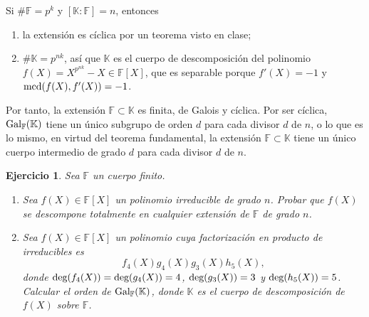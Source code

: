 \documentclass[11pt]{report}
\makeatletter
\renewenvironment{proof}[1][\proofname]{\par
  \pushQED{\qed}%
  \normalfont \topsep\z@skip %
  \trivlist
  \item[\hskip\labelsep
        \itshape
    #1\@addpunct{.}]\ignorespaces
}{%
  \popQED\endtrivlist\@endpefalse
}
\newcommand{\F}{\mathbb F}
\newcommand{\K}{\mathbb K}
\newtheorem{ejercicio}{Ejercicio}
\makeatother
\begin{document}
\begin{proof}
Si $\#\F = p^k$ y $[\K \colon \F] = n$, entonces
\begin{enumerate}
    \item la extensión es cíclica por un teorema visto en clase;
    \item $\#\K = p^{nk}$, así que $\K$ es el cuerpo de descomposición del polinomio $f(X) =X^{p^{nk}}-X \in \F[X]$, que es separable porque $f'(X) = -1$ y $\textup{mcd}(f(X),f'(X))=-1$.
\end{enumerate}

Por tanto, la extensión $\F \subset \K$ es finita, de Galois y cíclica. Por ser cíclica, $\textup{Gal}_\F(\K)$ tiene un único subgrupo de orden $d$ para cada divisor $d$ de $n$, o lo que es lo mismo, en virtud del teorema fundamental, la extensión $\F \subset \K$ tiene un único cuerpo intermedio de grado $d$ para cada divisor $d$ de $n$.
\end{proof}

\begin{ejercicio}
Sea $\F$ un cuerpo finito.
\begin{enumerate}
    \item Sea $f(X) \in \F[X]$ un polinomio irreducible de grado $n$. Probar que $f(X)$ se descompone totalmente en cualquier extensión de $\F$ de grado $n$.
    \item Sea $f(X) \in \F[X]$ un polinomio cuya factorización en producto de irreducibles es
    \[f_4(X)g_4(X)g_3(X)h_5(X),\]
    donde $\textup{deg}(f_4(X)) = \textup{deg}(g_4(X)) =4$, $\textup{deg}(g_3(X)) = 3$ y $\textup{deg}(h_5(X))=5$. Calcular el orden de $\textup{Gal}_\F(\K)$, donde $\K$ es el cuerpo de descomposición de $f(X)$ sobre $\F$.
\end{enumerate}
\end{ejercicio}
\end{document}
